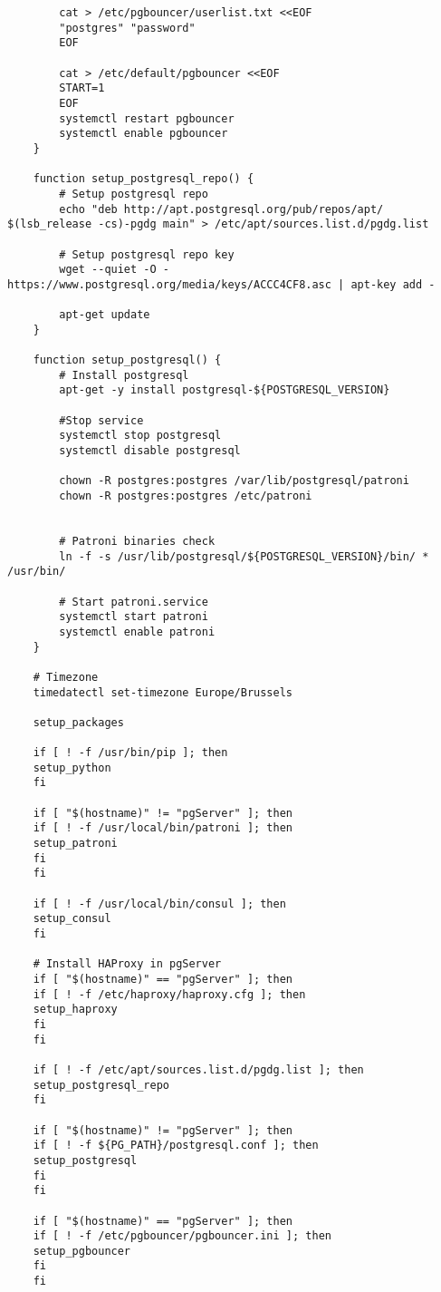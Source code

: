 \begin{lstlisting}
        cat > /etc/pgbouncer/userlist.txt <<EOF
        "postgres" "password"
        EOF
        
        cat > /etc/default/pgbouncer <<EOF
        START=1
        EOF
        systemctl restart pgbouncer
        systemctl enable pgbouncer
    }
    
    function setup_postgresql_repo() {
        # Setup postgresql repo
        echo "deb http://apt.postgresql.org/pub/repos/apt/ $(lsb_release -cs)-pgdg main" > /etc/apt/sources.list.d/pgdg.list
        
        # Setup postgresql repo key
        wget --quiet -O - https://www.postgresql.org/media/keys/ACCC4CF8.asc | apt-key add -
        
        apt-get update
    }
    
    function setup_postgresql() {
        # Install postgresql
        apt-get -y install postgresql-${POSTGRESQL_VERSION}
        
        #Stop service
        systemctl stop postgresql
        systemctl disable postgresql
        
        chown -R postgres:postgres /var/lib/postgresql/patroni
        chown -R postgres:postgres /etc/patroni
        
        
        # Patroni binaries check
        ln -f -s /usr/lib/postgresql/${POSTGRESQL_VERSION}/bin/ * /usr/bin/
        
        # Start patroni.service
        systemctl start patroni
        systemctl enable patroni
    }
    
    # Timezone
    timedatectl set-timezone Europe/Brussels
    
    setup_packages
    
    if [ ! -f /usr/bin/pip ]; then
    setup_python
    fi
    
    if [ "$(hostname)" != "pgServer" ]; then
    if [ ! -f /usr/local/bin/patroni ]; then
    setup_patroni
    fi
    fi
    
    if [ ! -f /usr/local/bin/consul ]; then
    setup_consul
    fi
    
    # Install HAProxy in pgServer
    if [ "$(hostname)" == "pgServer" ]; then
    if [ ! -f /etc/haproxy/haproxy.cfg ]; then
    setup_haproxy
    fi
    fi
    
    if [ ! -f /etc/apt/sources.list.d/pgdg.list ]; then
    setup_postgresql_repo
    fi
    
    if [ "$(hostname)" != "pgServer" ]; then
    if [ ! -f ${PG_PATH}/postgresql.conf ]; then
    setup_postgresql
    fi
    fi
    
    if [ "$(hostname)" == "pgServer" ]; then
    if [ ! -f /etc/pgbouncer/pgbouncer.ini ]; then
    setup_pgbouncer
    fi
    fi
\end{lstlisting}

